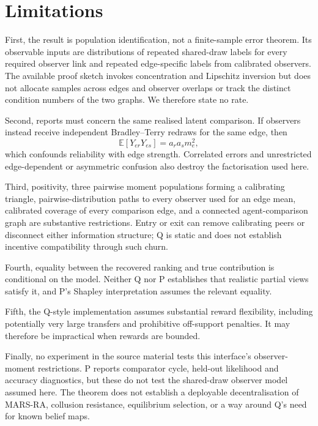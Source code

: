 \documentclass{article}
\begin{document}
\section{Limitations}

First, the result is population identification, not a finite-sample error theorem.  Its observable inputs are distributions of repeated shared-draw labels for every required observer link and repeated edge-specific labels from calibrated observers.  The available proof sketch invokes concentration and Lipschitz inversion but does not allocate samples across edges and observer overlaps or track the distinct condition numbers of the two graphs.  We therefore state no rate. %

Second, reports must concern the same realised latent comparison.  If observers instead receive independent Bradley--Terry redraws for the same edge, then
\[
\mathbb{E}[Y_{er}Y_{es}]=a_ra_sm_e^2,
\]
which confounds reliability with edge strength. %
Correlated errors and unrestricted edge-dependent or asymmetric confusion also destroy the factorisation used here. %

Third, positivity, three pairwise moment populations forming a calibrating triangle, pairwise-distribution paths to every observer used for an edge mean, calibrated coverage of every comparison edge, and a connected agent-comparison graph are substantive restrictions.  Entry or exit can remove calibrating peers or disconnect either information structure; Q is static and does not establish incentive compatibility through such churn. %

Fourth, equality between the recovered ranking and true contribution is conditional on the model.  Neither Q nor P establishes that realistic partial views satisfy it, and P's Shapley interpretation assumes the relevant equality. %

Fifth, the Q-style implementation assumes substantial reward flexibility, including potentially very large transfers and prohibitive off-support penalties.  It may therefore be impractical when rewards are bounded. %

Finally, no experiment in the source material tests this interface's observer-moment restrictions.  P reports comparator cycle, held-out likelihood and accuracy diagnostics, but these do not test the shared-draw observer model assumed here.  The theorem does not establish a deployable decentralisation of MARS-RA, collusion resistance, equilibrium selection, or a way around Q's need for known belief maps. %
\end{document}
